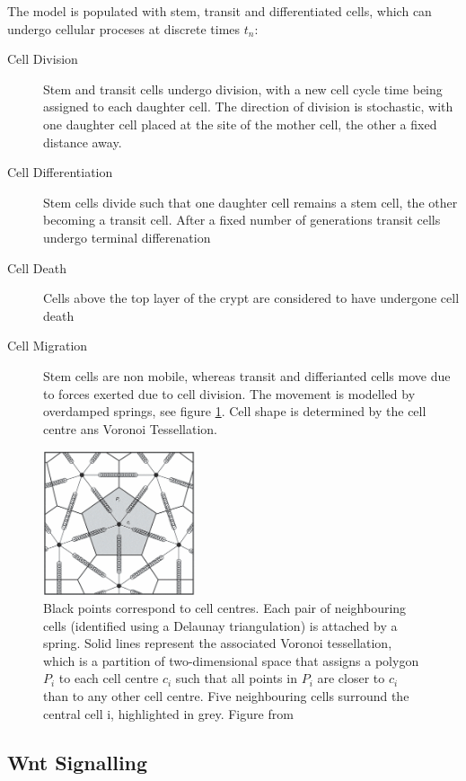 \documentclass[11pt]{article} %
\begin{document}
The model is populated with stem, transit and differentiated cells, which can undergo cellular proceses at discrete times $t_n$:
\begin{description}
\item[Cell Division]{Stem and transit cells undergo division, with a new cell cycle time being assigned to each daughter cell. The direction of division is stochastic, with one daughter cell placed at the site of the mother cell, the other a fixed distance away.}
\item[Cell Differentiation]{Stem cells divide such that one daughter cell remains a stem cell, the other becoming a transit cell. After a fixed number of generations transit cells undergo terminal differenation}
\item[Cell Death]{Cells above the top layer of the crypt are considered to have undergone cell death}
\item[Cell Migration]{Stem cells are non mobile, whereas transit and differianted cells move due to forces exerted due to cell division. The movement is modelled by overdamped springs, see figure \ref{fig:Mechanical_model}. Cell shape is determined by the cell centre ans Voronoi Tessellation.}
\end{description}

\begin{figure}
\centering
\includegraphics[width=0.4\textwidth]{Mechanical_Model}
\caption{Black points
correspond to cell centres. Each pair of neighbouring cells (identified
using a Delaunay triangulation) is attached by a spring. Solid lines
represent the associated Voronoi tessellation, which is a partition of
two-dimensional space that assigns a polygon $P_i$ to each cell centre $c_i$
such that all points in $P_i$ are closer to $c_i$ than to any other cell centre. Five
neighbouring cells surround the central cell i, highlighted in grey. Figure from \cite{VanLeeuwen2009} }
\label{fig:Mechanical_model}
\end{figure}

\subsection{Wnt Signalling}
\end{document}
